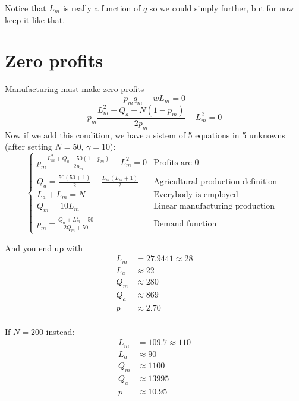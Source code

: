 \documentclass[]{article}
\begin{document}
Notice that $L_m$ is really a function of $q$ so we could simply further, but for now keep it like that.

\section{Zero profits}
Manufacturing must make zero profits
\[ p_m q_m - w L_m = 0\]
\[ p_m \frac{L^2_m + Q_a +N(1 - p_m)}{2p_m} - L^2_m = 0\]
Now if we add this condition, we have a sistem of 5 equations in 5 unknowns (after setting $N=50$, $\gamma=10$):
\[
\begin{cases}  p_m \frac{L^2_m + Q_a +50(1 - p_m)}{2p_m} - L^2_m = 0 & \text{Profits are 0 }
\\ Q_a =  \frac{50(50+1)}{2} - \frac{L_m(L_m+1)}{2} & \text{Agricultural production definition } \\
 L_a + L_m = N &\text{Everybody is employed } \\ 
Q_m = 10 L_m &\text{Linear manufacturing production } \\
p_m = \frac{Q_a + L_m^2 + 50}{2 Q_m + 50} &\text{Demand function }
 \end{cases} 
\]

And you end up with
\begin{align*}
L_m &= 27.9441 \approx 28 \\
L_a &\approx 22 \\
Q_m &\approx 280 \\
Q_a &\approx 869 \\
p &\approx 2.70 \\
\end{align*}


If $N=200$ instead:
\begin{align*}
L_m &= 109.7 \approx 110 \\
L_a &\approx 90 \\
Q_m &\approx 1100 \\
Q_a &\approx 13995 \\
p &\approx 10.95 \\
\end{align*}
\end{document}
